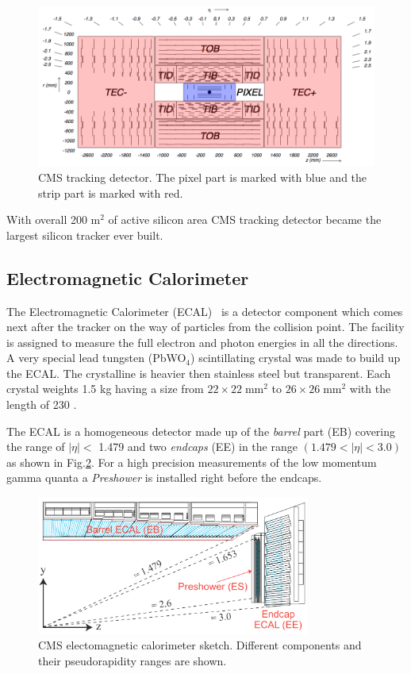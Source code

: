 \begin{figure}[t]
  \centering
  \includegraphics[width=1.1\textwidth]{02_experimental_setup/plots/img_cms_tracker_view.png}
  \caption{CMS tracking detector. The pixel part is marked with blue and the strip part is marked with red.}
  \label{fig:tracker}
\end{figure}

With overall 200 m$^2$ of active silicon area CMS tracking detector became the largest silicon tracker ever built. 

\subsection{Electromagnetic Calorimeter}

The Electromagnetic Calorimeter (ECAL)~\cite{ECALtdr, ECALtdradd, CMSatLHC} is a detector component which comes next after the tracker on the way of particles from
the collision point. The facility is assigned to measure the full electron and photon energies in all the directions. 
A very special lead tungsten (PbWO$_{4}$) scintillating crystal was made to build up the ECAL. The crystalline is heavier then stainless steel but transparent. 
Each crystal weights 1.5 kg having a size from $22\times22\;$mm$^2$ to $26\times26\;$mm$^2$ with the length of 230 .

The ECAL is a homogeneous detector made up of the \textit{barrel} part (EB) covering the range of $|\eta| <$ 1.479 and two \textit{endcaps} (EE) in the range $(1.479 < |\eta| < 3.0)$
as shown in Fig.\ref{fig:ecal}. For a high precision measurements of the low momentum gamma quanta a \textit{Preshower} is installed right before 
the endcaps.

\begin{figure}[t]
  \centering
  \includegraphics[width=0.8\textwidth]{02_experimental_setup/plots/Figures_Experimental_Apparatus_ECALRapidity.png}
  \caption{CMS electomagnetic calorimeter sketch. Different components and their pseudorapidity ranges are shown.}
  \label{fig:ecal}
\end{figure}

